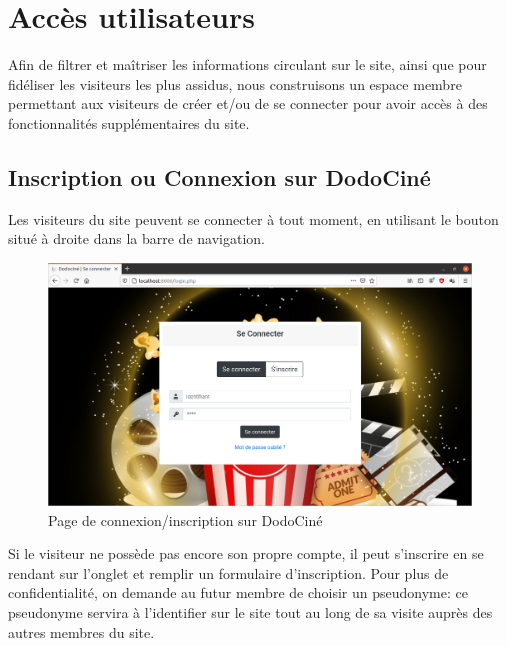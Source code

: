 \chapter{Accès utilisateurs}

    Afin de filtrer et maîtriser les informations circulant sur le site, ainsi que pour fidéliser les visiteurs les plus assidus, nous construisons un espace membre permettant aux visiteurs de créer et/ou de se connecter pour avoir accès à des fonctionnalités supplémentaires du site.

    \section{Inscription ou Connexion sur DodoCiné}

        Les visiteurs du site peuvent se connecter à tout moment, en utilisant le bouton  situé à droite dans la barre de navigation. 


        \begin{figure}[!ht]
            \centering
            \includegraphics[width=15cm]{img/connexion.png}
            \caption{Page de connexion/inscription sur DodoCiné}
        \end{figure}

        \medskip
        Si le visiteur ne possède pas encore son propre compte, il peut s'inscrire en se rendant sur l'onglet  et remplir un formulaire d'inscription. Pour plus de confidentialité, on demande au futur membre de choisir un pseudonyme: ce pseudonyme servira à l'identifier sur le site tout au long de sa visite auprès des autres membres du site.


